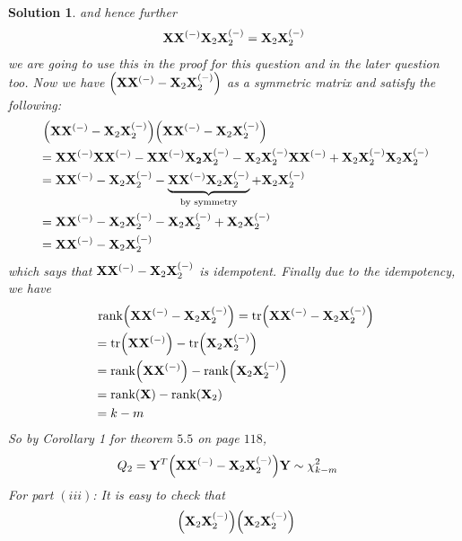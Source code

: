 \documentclass[11pt]{article}
\newtheorem{sol}{Solution}
\begin{document}
\begin{sol}
	and hence further
	\begin{align*}
		{\bf X}{\bf X}^{(-)}{\bf X}_2{\bf X}_2^{(-)} = {\bf X}_2{\bf X}_2^{(-)}
	\end{align*}
	we are going to use this in the proof for this question and in the later question too.\vskip 2mm
	Now we have $\Big({\bf X}{\bf X}^{(-)} - {\bf X}_2{\bf X}_2^{(-)}\Big)$ as a symmetric matrix and satisfy the following:
	\begin{align*}
		&\ \Big({\bf X}{\bf X}^{(-)} - {\bf X}_2{\bf X}_2^{(-)}\Big)\Big({\bf X}{\bf X}^{(-)} - {\bf X}_2{\bf X}_2^{(-)}\Big)\\
		&= {\bf X}{\bf X}^{(-)}{\bf X}{\bf X}^{(-)} - {\bf X}{\bf X}^{(-)}{\bf X_2}{\bf X}_2^{(-)} - {\bf X}_2{\bf X}_2^{(-)}{\bf X}{\bf X}^{(-)} + {\bf X}_2{\bf X}_2^{(-)}{\bf X}_2{\bf X}_2^{(-)}\\
		&= {\bf X}{\bf X}^{(-)} - {\bf X}_2{\bf X}_2^{(-)} - \underbrace{{\bf X}{\bf X}^{(-)}{\bf X}_2{\bf X}_2^{(-)}}_{\text{by symmetry}} + {\bf X}_2{\bf X}_2^{(-)}\\
		&= {\bf X}{\bf X}^{(-)} - {\bf X}_2{\bf X}_2^{(-)} - {\bf X}_2{\bf X}_2^{(-)} + {\bf X}_2{\bf X}_2^{(-)}\\
		&=  {\bf X}{\bf X}^{(-)} - {\bf X}_2{\bf X}_2^{(-)}
	\end{align*}
	which says that ${\bf X}{\bf X}^{(-)} - {\bf X}_2{\bf X}_2^{(-)}$ is idempotent.\vskip 2mm
	Finally due to the idempotency, we have
	\begin{align*}
		&\ \text{rank}\Big({\bf X}{\bf X}^{(-)} - {\bf X}_2{\bf X}_2^{(-)}\Big) = \text{tr}\Big({\bf X}{\bf X}^{(-)} - {\bf X}_2{\bf X}_2^{(-)}\Big)\\
		&= \text{tr}\Big({\bf X}{\bf X}^{(-)}\Big) - \text{tr}\Big({\bf X}_2{\bf X}_2^{(-)}\Big)\\
		&=  \text{rank}\Big({\bf X}{\bf X}^{(-)}\Big)  - \text{rank}\Big({\bf X}_2{\bf X}_2^{(-)}\Big)\\
		&= \text{rank}({\bf X}) - \text{rank}({\bf X}_2)\\
		&= k - m
	\end{align*}
	So by Corollary 1 for theorem $5.5$ on page $118$,
	\begin{align*}
		Q_2 &= {\bf Y}^T\Big({\bf X}{\bf X}^{(-)} - {\bf X}_2{\bf X}_2^{(-)}\Big){\bf Y} \sim \chi^2_{k - m} 
	\end{align*}
	\vskip 2mm
	For part $(iii)$:\vskip 2mm
	It is easy to check that
	\begin{align*}
		&\ \Big({\bf X}_2{\bf X}_2^{(-)}\Big)\Big({\bf X}_2{\bf X}_2^{(-)}\Big)\\

\end{align*}
\end{sol}
\end{document}

